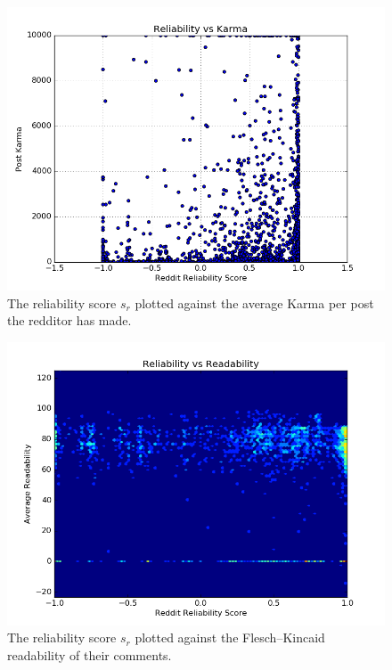 \begin{figure}[tb]
    \centering
    \includegraphics[width=\linewidth]{figures/reliability_post_karma.png}
    \caption{The reliability score $s_r$ plotted against the average Karma per post the redditor has made.}
    \label{fig:reliability_post_karma}
\end{figure}

\begin{figure}[tb]
    \centering
    \includegraphics[width=\linewidth]{figures/reliability_readability.png}
    \caption{The reliability score $s_r$ plotted against the Flesch--Kincaid readability of their comments.}
    \label{fig:reliability_readability}
\end{figure}

